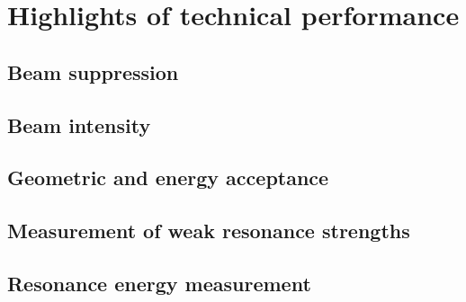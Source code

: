 \section{Highlights of technical performance}

\subsection{Beam suppression}

\subsection{Beam intensity}

\subsection{Geometric and energy acceptance}

\subsection{Measurement of weak resonance strengths}

\subsection{Resonance energy measurement}
